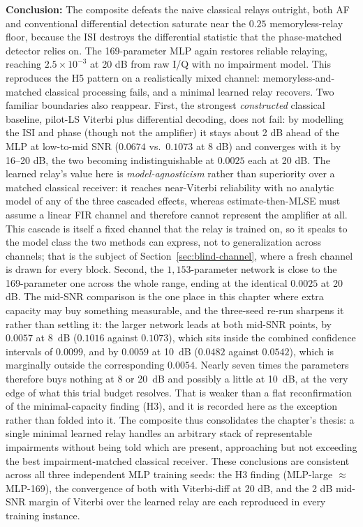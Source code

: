 \textbf{Conclusion:} The composite defeats the naive classical relays outright, both AF and conventional differential detection saturate near the $0.25$ memoryless-relay floor, because the ISI destroys the differential statistic that the phase-matched detector relies on. The 169-parameter MLP again restores reliable relaying, reaching $2.5\times10^{-3}$ at 20 dB from raw I/Q with no impairment model. This reproduces the H5 pattern on a realistically mixed channel: memoryless-and-matched classical processing fails, and a minimal learned relay recovers. Two familiar boundaries also reappear. First, the strongest \emph{constructed} classical baseline, pilot-LS Viterbi plus differential decoding, does not fail: by modelling the ISI and phase (though not the amplifier) it stays about 2 dB ahead of the MLP at low-to-mid SNR ($0.0674$ vs.\ $0.1073$ at 8 dB) and converges with it by 16--20 dB, the two becoming indistinguishable at $0.0025$ each at 20 dB. The learned relay's value here is \emph{model-agnosticism} rather than superiority over a matched classical receiver: it reaches near-Viterbi reliability with no analytic model of any of the three cascaded effects, whereas estimate-then-MLSE must assume a linear FIR channel and therefore cannot represent the amplifier at all. This cascade is itself a fixed channel that the relay is trained on, so it speaks to the model class the two methods can express, not to generalization across channels; that is the subject of Section~\ref{sec:blind-channel}, where a fresh channel is drawn for every block. Second, the $1{,}153$-parameter network is close to the 169-parameter one across the whole range, ending at the identical $0.0025$ at 20 dB. The mid-SNR comparison is the one place in this chapter where extra capacity may buy something measurable, and the three-seed re-run sharpens it rather than settling it: the larger network leads at both mid-SNR points, by $0.0057$ at 8~dB ($0.1016$ against $0.1073$), which sits inside the combined confidence intervals of $0.0099$, and by $0.0059$ at 10~dB ($0.0482$ against $0.0542$), which is marginally outside the corresponding $0.0054$. Nearly seven times the parameters therefore buys nothing at 8 or 20~dB and possibly a little at 10~dB, at the very edge of what this trial budget resolves. That is weaker than a flat reconfirmation of the minimal-capacity finding (H3), and it is recorded here as the exception rather than folded into it. The composite thus consolidates the chapter's thesis: a single minimal learned relay handles an arbitrary stack of representable impairments without being told which are present, approaching but not exceeding the best impairment-matched classical receiver. These conclusions are consistent across all three independent MLP training seeds: the H3 finding (MLP-large $\approx$ MLP-169), the convergence of both with Viterbi-diff at 20 dB, and the 2 dB mid-SNR margin of Viterbi over the learned relay are each reproduced in every training instance.

